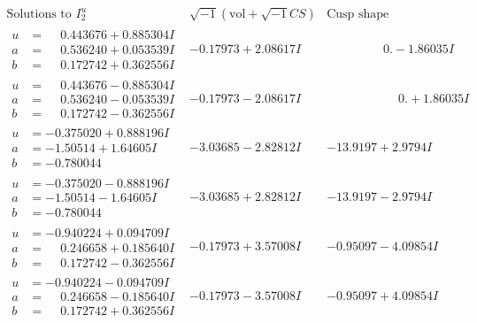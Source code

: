 \documentclass[1p]{elsarticle_modified}
\theoremstyle{definition}
\newcommand{\I}{\sqrt{-1}}
\begin{document}
$$\begin{array}{c|c|c}  
\text{Solutions to }I^u_{2}& \I (\text{vol} + \sqrt{-1}CS) & \text{Cusp shape}\\
 \hline 
\begin{aligned}
u &= \phantom{-}0.443676 + 0.885304 I \\
a &= \phantom{-}0.536240 + 0.053539 I \\
b &= \phantom{-}0.172742 + 0.362556 I\end{aligned}
 & -0.17973 + 2.08617 I & \phantom{-0.000000 } 0. - 1.86035 I \\ \hline\begin{aligned}
u &= \phantom{-}0.443676 - 0.885304 I \\
a &= \phantom{-}0.536240 - 0.053539 I \\
b &= \phantom{-}0.172742 - 0.362556 I\end{aligned}
 & -0.17973 - 2.08617 I & \phantom{-0.000000 -}0. + 1.86035 I \\ \hline\begin{aligned}
u &= -0.375020 + 0.888196 I \\
a &= -1.50514 + 1.64605 I \\
b &= -0.780044\phantom{ +0.000000I}\end{aligned}
 & -3.03685 - 2.82812 I & -13.9197 + 2.9794 I \\ \hline\begin{aligned}
u &= -0.375020 - 0.888196 I \\
a &= -1.50514 - 1.64605 I \\
b &= -0.780044\phantom{ +0.000000I}\end{aligned}
 & -3.03685 + 2.82812 I & -13.9197 - 2.9794 I \\ \hline\begin{aligned}
u &= -0.940224 + 0.094709 I \\
a &= \phantom{-}0.246658 + 0.185640 I \\
b &= \phantom{-}0.172742 - 0.362556 I\end{aligned}
 & -0.17973 + 3.57008 I & -0.95097 - 4.09854 I \\ \hline\begin{aligned}
u &= -0.940224 - 0.094709 I \\
a &= \phantom{-}0.246658 - 0.185640 I \\
b &= \phantom{-}0.172742 + 0.362556 I\end{aligned}
 & -0.17973 - 3.57008 I & -0.95097 + 4.09854 I \\ \hline\begin{aligned}

\end{aligned}
\end{array}$$
\end{document}
